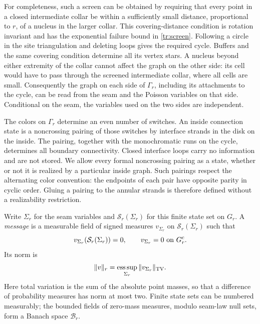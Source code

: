 For completeness, such a screen can be obtained by requiring that every
point in a closed intermediate collar be within a sufficiently small
distance, proportional to $r$, of a nucleus in the larger collar.  This
covering-distance condition is rotation invariant and has the
exponential failure bound in \eqref{tr:screen}.  Following a circle in the
site triangulation and deleting loops gives the required cycle.  Buffers
and the same covering condition determine all its vertex stars.  A
nucleus beyond either extremity of the collar cannot affect the graph
on the other side: its cell would have to pass through the screened
intermediate collar, where all cells are small.  Consequently the graph
on each side of $\Gamma_r$, including its attachments to the cycle, can
be read from the seam and the Poisson variables on that side.  Conditional
on the seam, the variables used on the two sides are independent.

The colors on $\Gamma_r$ determine an even number of switches.  An inside
connection state is a noncrossing pairing of those switches by interface
strands in the disk on the inside.  The pairing, together with the
monochromatic runs on the cycle, determines all boundary connectivity.
Closed interface loops carry no information and are not stored.  We
allow every formal noncrossing pairing as a state, whether or not it is
realized by a particular inside graph.  Such pairings respect the
alternating color convention: the endpoints of each pair have opposite
parity in cyclic order.  Gluing a pairing to the annular strands is
therefore defined without a realizability restriction.

Write $\Sigma_r$ for the seam variables and $\mathcal S_r(\Sigma_r)$ for
this finite state set on $G_r$.  A \emph{message} is a measurable field
of signed measures $v_{\Sigma_r}$ on $\mathcal S_r(\Sigma_r)$ such that
\[
 v_{\Sigma_r}(\mathcal S_r(\Sigma_r))=0,
 \qquad v_{\Sigma_r}=0\ \hbox{on }G_r^c.
\]
Its norm is
\begin{equation}
  \|v\|_r
    =\operatorname*{ess\,sup}_{\Sigma_r}
                       \|v_{\Sigma_r}\|_{\mathrm{TV}}.
\label{tr:message-norm}
\end{equation}
Here total variation is the sum of the absolute point masses, so that a
difference of probability measures has norm at most two.  Finite state
sets can be numbered measurably; the bounded fields of zero-mass measures,
modulo seam-law null sets, form a Banach space $\mathcal B_r$.

